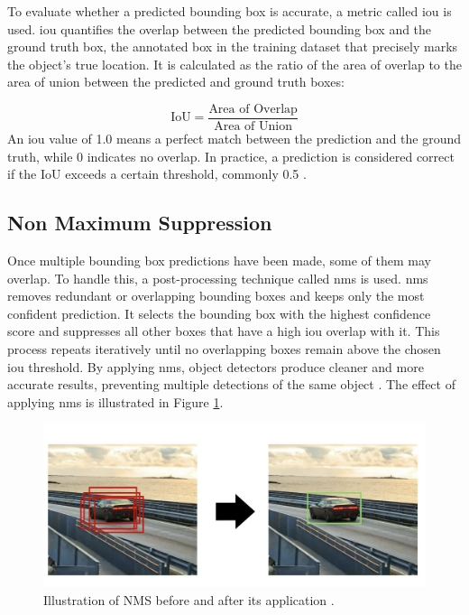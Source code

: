 To evaluate whether a predicted bounding box is accurate, a metric called \gls{iou} is used. \gls{iou} quantifies the overlap between the predicted bounding box and the ground truth box, the annotated box in the training dataset that precisely marks the object's true location. It is calculated as the ratio of the area of overlap to the area of union between the predicted and ground truth boxes:

\[
\text{IoU} = \frac{\text{Area of Overlap}}{\text{Area of Union}}
\]
An \gls{iou} value of 1.0 means a perfect match between the prediction and the ground truth, while 0 indicates no overlap. In practice, a prediction is considered correct if the IoU exceeds a certain threshold, commonly 0.5 \cite{ultralytics:iou}. \\

\subsection{Non Maximum Suppression}

 Once multiple bounding box predictions have been made, some of them may overlap. To handle this, a post-processing technique called \gls{nms} is used. \gls{nms} removes redundant or overlapping bounding boxes and keeps only the most confident prediction. It selects the bounding box with the highest confidence score and suppresses all other boxes that have a high \gls{iou} overlap with it. This process repeats iteratively until no overlapping boxes remain above the chosen \gls{iou} threshold. By applying \gls{nms}, object detectors produce cleaner and more accurate results, preventing multiple detections of the same object
\cite{thepythoncode:nms}. The effect of applying \gls{nms} is illustrated in Figure \ref{fig:nms}.

\begin{figure}[h!]
    \centering
    \includegraphics[width=0.75\linewidth]{figures/theory/image-recognition/nms.png}
    \caption[NMS before and after]{Illustration of NMS before and after its application \cite{thepythoncode:nms}.}
    \label{fig:nms}
\end{figure}

